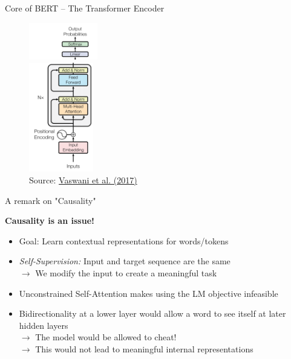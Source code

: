 \begin{vbframe}{Core of BERT -- The Transformer Encoder}

\begin{figure}
	\centering
		\includegraphics[width = 3cm]{figure/bert-top.png}\\ 
		\includegraphics[width = 2.8cm]{figure/bert-bottom.png}\\ 
	\footnotesize{Source:} \href{https://arxiv.org/pdf/1706.03762.pdf}{Vaswani et al. (2017)}
\end{figure}

\end{vbframe}


\begin{vbframe}{A remark on "Causality"}

\vfill

\textbf{Causality is an issue!}
	
\begin{itemize}
	\item Goal: Learn contextual representations for words/tokens
	\item \textit{Self-Supervision:} Input and target sequence are the same\\
				$\rightarrow$ We modify the input to create a meaningful task 
	\item Unconstrained Self-Attention makes using the LM objective infeasible
	\item Bidirectionality at a lower layer would allow a word to see itself at later hidden layers\\
				$\rightarrow$ The model would be allowed to cheat!\\
				$\rightarrow$ This would not lead to meaningful internal representations
\end{itemize}

\vfill

\end{vbframe}

